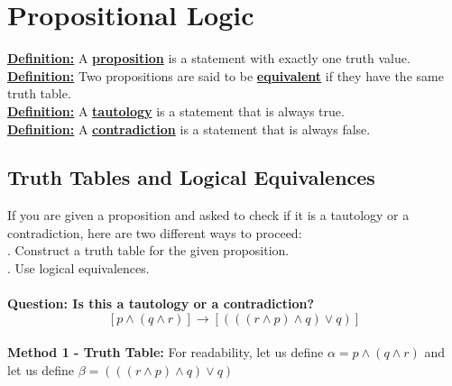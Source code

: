 \chapter{Propositional Logic}
\underline{\textbf{Definition:}} A \underline{\textbf{proposition}} is a
statement with exactly one truth value.\\
\underline{\textbf{Definition:}} Two propositions are said to be
\underline{\textbf{equivalent}} if they have the same truth table.\\
\underline{\textbf{Definition:}} A \underline{\textbf{tautology}} is a
statement that is always true.\\
\underline{\textbf{Definition:}} A \underline{\textbf{contradiction}} is a
statement that is always false.\\

\section{Truth Tables and Logical Equivalences}
If you are given a proposition and asked to check if it is a tautology or a
contradiction, here are two different ways to proceed: \\
. Construct a truth table for the given proposition. \\
. Use logical equivalences. \\ \\
\noindent
\textbf{Question: Is this a tautology or a contradiction? $$[p \wedge (q \wedge
r)] \rightarrow [( ( (r \wedge p)\wedge q) \vee q)]$$} \\
\textbf{Method 1 - Truth Table: }
For readability, let us define $\alpha =  p \wedge (q \wedge r)$ and let us
define $\beta = ( ( (r \wedge p)\wedge q) \vee q)$
\pagebreak[4]

